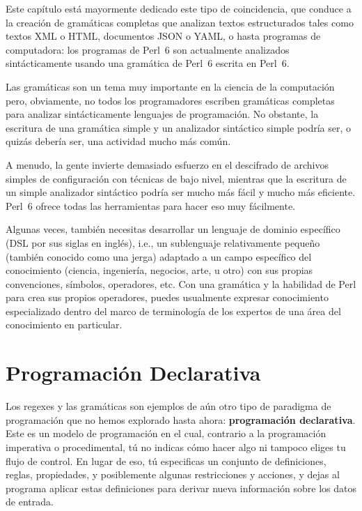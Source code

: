 
Este capítulo está mayormente dedicado este tipo de 
coincidencia, que conduce a la creación de gramáticas completas
que analizan textos estructurados tales como textos XML o HTML, 
documentos JSON o YAML, o hasta programas de computadora: 
los programas de Perl~6 son actualmente analizados sintácticamente
usando una gramática de Perl~6 escrita en Perl~6.

Las gramáticas son un tema muy importante en la ciencia de
la computación pero, obviamente, no todos los programadores
escriben gramáticas completas para analizar sintácticamente
lenguajes de programación. No obstante, la escritura de una
gramática simple y un analizador sintáctico simple podría
ser, o quizás debería ser, una actividad mucho más común.

A menudo, la gente invierte demasiado esfuerzo en el descifrado
de archivos simples de configuración con técnicas de bajo nivel,
mientras que la escritura de un simple analizador sintáctico
podría ser mucho más fácil y mucho más eficiente. Perl~6
ofrece todas las herramientas para hacer eso muy fácilmente.


Algunas veces, también necesitas desarrollar un lenguaje 
de dominio específico (DSL por sus siglas en inglés), i.e.,
un sublenguaje relativamente pequeño (también conocido como una
jerga) adaptado a un campo específico del conocimiento
(ciencia, ingeniería, negocios, arte, u otro) con sus propias
convenciones, símbolos, operadores, etc. Con una gramática y la 
habilidad de Perl para crea sus propios operadores, puedes usualmente
expresar conocimiento especializado dentro del marco de terminología
de los expertos de una área del conocimiento en particular.

\section{Programación Declarativa}

Los regexes y las gramáticas son ejemplos de aún otro tipo
de paradigma de programación que no hemos explorado hasta ahora:
{\bf programación declarativa}. Este es un modelo de programación
en el cual, contrario a la programación imperativa o procedimental,
tú no indicas cómo hacer algo ni tampoco eliges tu flujo de control.
En lugar de eso, tú especificas un conjunto de definiciones, reglas,
propiedades, y posiblemente algunas restricciones y acciones, y dejas
al programa aplicar estas definiciones para derivar nueva información
sobre los datos de entrada.

